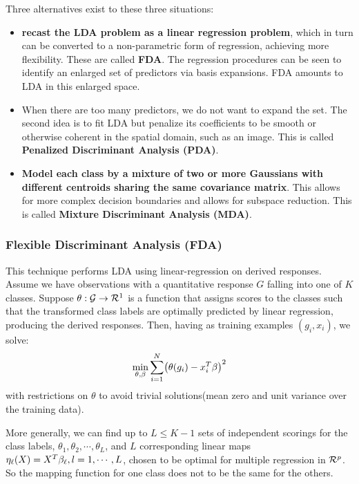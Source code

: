 Three alternatives exist to these three situations:
\begin{itemize}
\item \textbf{recast the LDA problem as a linear regression problem}, which in turn can be converted to a non-parametric form of regression, achieving more flexibility. These are called \textbf{FDA}. The regression procedures can be seen to identify an enlarged set of predictors via basis expansions. FDA amounts to LDA in this enlarged space.
\item When there are too many predictors, we do not want to expand the set. The second idea is to fit LDA but penalize its coefficients to be smooth or otherwise coherent in the spatial domain, such as an image. This is called \textbf{Penalized Discriminant Analysis (PDA)}.
\item \textbf{Model each class by a mixture of two or more Gaussians with different centroids sharing the same covariance matrix}. This allows for more complex decision boundaries and allows for subspace reduction. This is called \textbf{Mixture Discriminant Analysis (MDA)}.
\end{itemize}

\subsubsection{Flexible Discriminant Analysis (FDA)}
This technique performs LDA using linear-regression on derived responses.
Assume we have observations with a quantitative response $G$ falling into one of $K$ classes. Suppose $\theta:\CMcal{G} \rightarrow \CMcal{R}^1$ is a function that assigns scores to the classes such that the transformed class labels are optimally predicted by linear regression, producing the derived responses. Then, having as training examples $(g_i, x_i)$, we solve:
\begin{equation}
\min_{\theta, \be} \sum_{i=1}^N \br{\theta(g_i)-x_i^T\be}^2
\end{equation}
with restrictions on $\theta$ to avoid trivial solutions(mean zero and unit variance over the training data).

More generally, we can find up to $L \le K-1 $ sets of independent scorings for the class labels, $\theta_1, \theta_2, \cdots , \theta_L$, and $L$ corresponding linear maps $\eta_\ell(X) = X^T \mathbf{\beta}_\ell, l = 1,\cdots, L$, chosen to be optimal for multiple regression in $\CMcal{R}^p$. So the mapping function for one class does not to be the same for the others.

